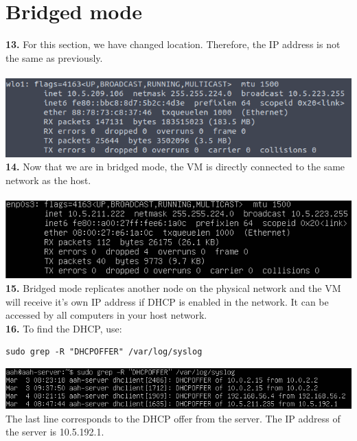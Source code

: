 \documentclass[12pt]{extarticle}
\begin{document}
\section{Bridged mode}
\textbf{13.} For this section, we have changed location. Therefore, the IP address is not the same as previously.\\~\\
\includegraphics[scale=0.6]{resources/13.png}\\

\textbf{14.} Now that we are in bridged mode, the VM is directly connected to the same network as the host.\\~\\
\includegraphics[scale=0.7]{resources/14.png}\\

\textbf{15.} Bridged mode replicates another node on the physical network and the VM will receive it's own IP address if DHCP is enabled in the network. It can be accessed by all computers in your host network.\\

\textbf{16.} To find the DHCP, use:
\begin{verbatim}
sudo grep -R "DHCPOFFER" /var/log/syslog
\end{verbatim}
\includegraphics[scale=0.6]{resources/15.png}\\
The last line corresponds to the DHCP offer from the server. The IP address of the server is 10.5.192.1.\\
\end{document}
